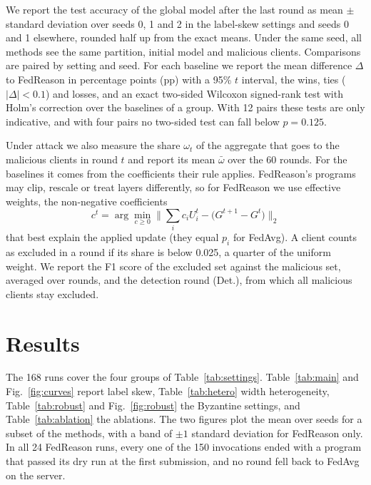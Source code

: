 \documentclass[3p,times,a4paper]{elsarticle}
\begin{document}
We report the test accuracy of the global model after the last round as mean $\pm$ standard deviation over seeds 0, 1 and 2 in the label-skew settings and seeds 0 and 1 elsewhere, rounded half up from the exact means. Under the same seed, all methods see the same partition, initial model and malicious clients. Comparisons are paired by setting and seed. For each baseline we report the mean difference $\Delta$ to FedReason in percentage points (pp) with a 95\% $t$ interval, the wins, ties ($|\Delta|<0.1$) and losses, and an exact two-sided Wilcoxon signed-rank test with Holm's correction over the baselines of a group. With 12 pairs these tests are only indicative, and with four pairs no two-sided test can fall below $p=0.125$.

Under attack we also measure the share $\omega_t$ of the aggregate that goes to the malicious clients in round $t$ and report its mean $\bar\omega$ over the 60 rounds. For the baselines it comes from the coefficients their rule applies. FedReason's programs may clip, rescale or treat layers differently, so for FedReason we use effective weights, the non-negative coefficients
\begin{equation}
  c^t=\arg\min_{c\ge0}\Big\lVert\sum_ic_iU_i^t-\big(G^{t+1}-G^t\big)\Big\rVert_2
  \label{eq:effective}
\end{equation}
that best explain the applied update (they equal $p_i$ for FedAvg). A client counts as excluded in a round if its share is below 0.025, a quarter of the uniform weight. We report the F1 score of the excluded set against the malicious set, averaged over rounds, and the detection round (Det.), from which all malicious clients stay excluded.

\section{Results}
\label{sec:results}

The 168 runs cover the four groups of Table~\ref{tab:settings}. Table~\ref{tab:main} and Fig.~\ref{fig:curves} report label skew, Table~\ref{tab:hetero} width heterogeneity, Table~\ref{tab:robust} and Fig.~\ref{fig:robust} the Byzantine settings, and Table~\ref{tab:ablation} the ablations. The two figures plot the mean over seeds for a subset of the methods, with a band of $\pm1$ standard deviation for FedReason only. In all 24 FedReason runs, every one of the 150 invocations ended with a program that passed its dry run at the first submission, and no round fell back to FedAvg on the server.
\end{document}
